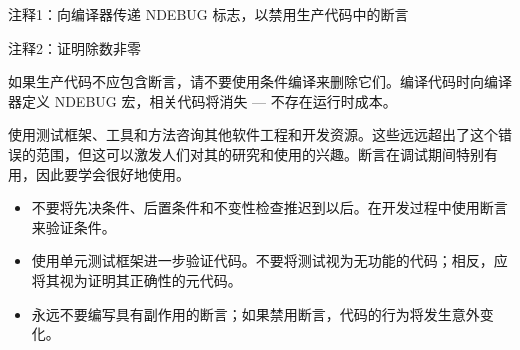 {\footnotesize
注释1：向编译器传递 NDEBUG 标志，以禁用生产代码中的断言

注释2：证明除数非零
}

如果生产代码不应包含断言，请不要使用条件编译来删除它们。编译代码时向编译器定义 NDEBUG 宏，相关代码将消失 — 不存在运行时成本。

使用测试框架、工具和方法咨询其他软件工程和开发资源。这些远远超出了这个错误的范围，但这可以激发人们对其的研究和使用的兴趣。断言在调试期间特别有用，因此要学会很好地使用。


\begin{itemize}
\item
不要将先决条件、后置条件和不变性检查推迟到以后。在开发过程中使用断言来验证条件。

\item
使用单元测试框架进一步验证代码。不要将测试视为无功能的代码；相反，应将其视为证明其正确性的元代码。

\item
永远不要编写具有副作用的断言；如果禁用断言，代码的行为将发生意外变化。
\end{itemize}









